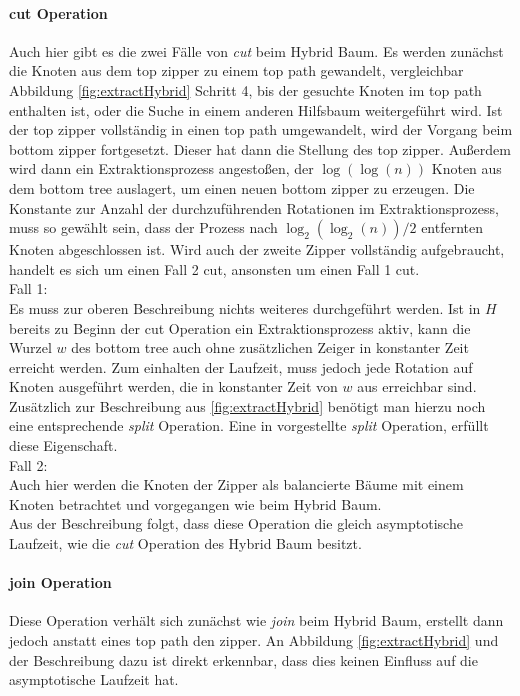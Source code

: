 \documentclass[a4paper,12pt]{article}
\begin{document}
\paragraph{cut Operation}
Auch hier gibt es die zwei Fälle von \textit{cut} beim Hybrid Baum. Es werden zunächst die Knoten aus dem top zipper zu einem top path gewandelt, vergleichbar Abbildung \ref{fig:extractHybrid} Schritt 4, bis der gesuchte Knoten im top path enthalten ist, oder die Suche in einem anderen Hilfsbaum weitergeführt wird. Ist der top zipper vollständig in einen top path umgewandelt, wird der Vorgang beim bottom zipper fortgesetzt. Dieser hat dann die Stellung des top zipper. Außerdem wird dann ein Extraktionsprozess angestoßen, der $\log\left(\log\left(n\right)\right)$ Knoten aus dem bottom tree auslagert, um einen neuen bottom zipper zu erzeugen. Die Konstante zur Anzahl der durchzuführenden Rotationen im Extraktionsprozess, muss so gewählt sein, dass der Prozess nach $\log_2\left(\log_2\left(n\right)\right) / 2$ entfernten Knoten abgeschlossen ist. Wird auch der zweite Zipper vollständig aufgebraucht, handelt es sich um einen Fall 2 cut, ansonsten um einen Fall 1 cut.\\
Fall 1:\\
Es muss zur oberen Beschreibung nichts weiteres durchgeführt werden. Ist in $H$ bereits zu Beginn der cut Operation ein Extraktionsprozess aktiv, kann die Wurzel $w$ des bottom tree auch ohne zusätzlichen Zeiger in konstanter Zeit erreicht werden. Zum einhalten der Laufzeit, muss jedoch jede Rotation auf Knoten ausgeführt werden, die in konstanter Zeit von $w$ aus erreichbar sind. Zusätzlich zur Beschreibung aus \ref{fig:extractHybrid} benötigt man hierzu noch eine entsprechende \textit{split} Operation. Eine in \cite{zipper} vorgestellte \textit{split} Operation, erfüllt diese Eigenschaft.\\
Fall 2:\\
Auch hier werden die Knoten der Zipper als balancierte Bäume mit einem Knoten betrachtet und vorgegangen wie beim Hybrid Baum.\\
Aus der Beschreibung folgt, dass diese Operation die gleich asymptotische Laufzeit, wie die \textit{cut} Operation des Hybrid Baum besitzt. 




\paragraph{join Operation}
Diese Operation verhält sich zunächst wie \textit{join} beim Hybrid Baum, erstellt dann jedoch anstatt eines top path den zipper. An Abbildung \ref{fig:extractHybrid} und der Beschreibung dazu ist direkt erkennbar, dass dies keinen Einfluss auf die asymptotische Laufzeit hat.   
\end{document}
